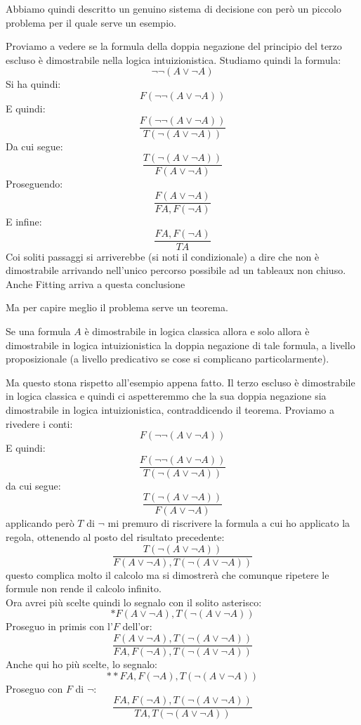 \documentclass[a4paper,12pt, oneside]{book}
\begin{document}
Abbiamo quindi descritto un genuino sistema di decisione con però un piccolo
problema per il quale serve un esempio. 
\begin{esempio}
  Proviamo a vedere se la formula della doppia negazione del principio del terzo
  escluso è dimostrabile nella logica intuizionistica. Studiamo quindi la
  formula: 
  \[\neg\neg(A\lor \neg A)\]
  Si ha quindi:
  \[F(\neg\neg(A\lor \neg A))\]
  E quindi:
  \[\frac{F(\neg\neg(A\lor \neg A))}{T(\neg (A\lor \neg A))}\]
  Da cui segue:
  \[\frac{T(\neg (A\lor \neg A))}{F(A\lor \neg A)}\]
  Proseguendo:
  \[\frac{F(A\lor \neg A)}{FA, F(\neg A)}\]
  E infine:
  \[\frac{FA, F(\neg A)}{TA}\]
  Coi soliti passaggi si arriverebbe (si noti il condizionale) a dire che non è
  dimostrabile arrivando nell'unico percorso possibile ad un tableaux non
  chiuso. \\
  Anche Fitting arriva a questa conclusione
\end{esempio}
Ma per capire meglio il problema serve un teorema.
\begin{teorema}
  Se una formula $A$ è dimostrabile in logica classica allora e solo allora è
  dimostrabile in logica intuizionistica la doppia negazione di tale formula, a
  livello proposizionale (a livello predicativo se cose si complicano
  particolarmente). 
\end{teorema}
Ma questo stona rispetto all'esempio appena fatto. Il terzo escluso è
dimostrabile in logica classica e quindi ci aspetteremmo che la sua doppia
negazione sia dimostrabile in logica intuizionistica, contraddicendo il teorema.
Proviamo a rivedere i conti:
\[F(\neg\neg(A\lor \neg A))\]
E quindi:
\[\frac{F(\neg\neg(A\lor \neg A))}{T(\neg (A\lor \neg A))}\]
da cui segue:
\[\frac{T(\neg (A\lor \neg A))}{F(A\lor \neg A)}\]
applicando però $T$ di $\neg$ mi premuro di riscrivere la formula a cui ho
applicato la regola, ottenendo al posto del risultato precedente:
\[\frac{T(\neg (A\lor \neg A))}{F(A\lor \neg A), T(\neg (A\lor \neg A))}\]
questo complica molto il calcolo ma si dimostrerà che comunque ripetere le
formule non rende il calcolo infinito.\\
Ora avrei più scelte quindi lo segnalo con il solito asterisco:
\[*F(A\lor \neg A), T(\neg (A\lor \neg A))\]
Proseguo in primis con l'$F$ dell'or:
\[\frac{F(A\lor \neg A), T(\neg (A\lor \neg A))}{FA, F(\neg A), T(\neg (A\lor
    \neg A))}\]
Anche qui ho più scelte, lo segnalo:
\[**FA, F(\neg A), T(\neg (A\lor\neg A))\]
Proseguo con $F$ di $\neg$:
\[\frac{FA, F(\neg A), T(\neg (A\lor\neg A))}{TA, T(\neg (A\lor\neg A))}\]
\end{document}
